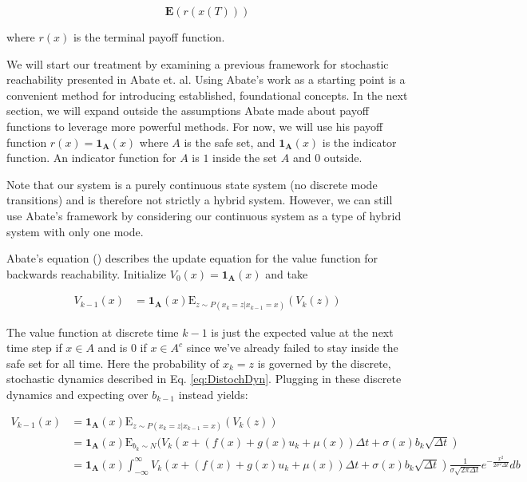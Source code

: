 \documentclass[a4paper]{article}
\begin{document}
$$
\mathbf{E}(r(x(T)))
$$

where $r(x)$ is the terminal payoff function.

We will start our treatment by examining a previous framework for stochastic reachability presented in Abate et. al. %
Using Abate's work as a starting point is a convenient method for introducing established, foundational concepts.
In the next section, we will expand outside the assumptions Abate made about payoff functions to leverage more powerful methods.
For now, we will use his payoff function $r(x) = \mathbf{1_A}(x)$ where $A$ is the safe set, and $\mathbf{1_A}(x)$ is the indicator function.
An indicator function for $A$ is $1$ inside the set $A$ and $0$ outside.

Note that our system is a purely continuous state system (no discrete mode transitions) and is therefore not strictly a hybrid system.
However, we can still use Abate's framework by considering our continuous system as a type of hybrid system with only one mode.

Abate's equation () describes the update equation for the value function for backwards reachability.
Initialize $V_0(x) = \mathbf{1_A}(x)$ and take

\begin{align}
V_{k-1}(x) & = \mathbf{1_A}(x) \mathrm{E}_{z \sim P(x_k = z | x_{k-1}=x)} (V_k(z))
\end{align}

The value function at discrete time $k-1$ is just the expected value at the next time step if $x \in A$ and is 0 if $x \in A^c$ since we've already failed to stay inside the safe set for all time.
Here the probability of $x_k = z$ is governed by the discrete, stochastic dynamics described in Eq. \ref{eq:DistochDyn}.
Plugging in these discrete dynamics and expecting over $b_{k-1}$ instead yields:

\begin{align}
V_{k-1}(x) & = \mathbf{1_A}(x) \mathrm{E}_{z \sim P(x_k = z | x_{k-1}=x)} (V_k(z))
\\ & = \mathbf{1_A}(x) \mathrm{E}_{b_k\sim N} (V_k( x + (f(x) + g(x) u_k + \mu(x)) \Delta t + \sigma(x) b_k \sqrt{\Delta t} )
\\ & = \mathbf{1_A}(x) \int_{-\infty}^{\infty} V_k( x + (f(x) + g(x) u_k + \mu(x)) \Delta t + \sigma(x) b_k \sqrt{\Delta t} )      \frac{1}{\sigma \sqrt{2 \pi \Delta t}} e^{-\frac{x^2}{2 \sigma^2 \Delta t}} db
\label{eq:AbateBrute}
\end{align}
\end{document}
